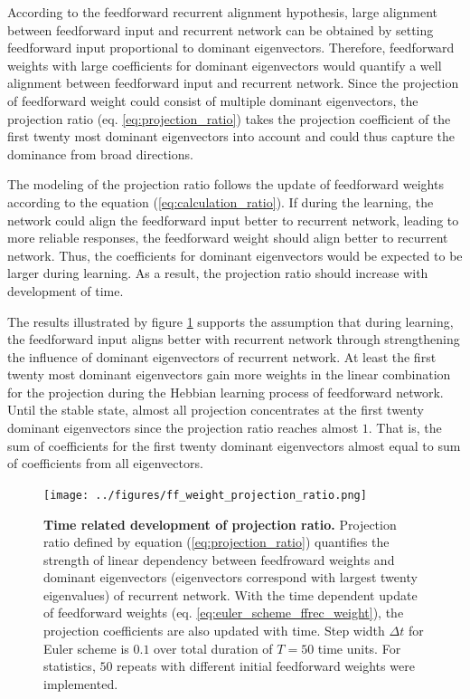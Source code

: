 \documentclass[11pt]{article}
\begin{document}
	According to the feedforward recurrent alignment hypothesis, large alignment between feedforward input and recurrent network can be obtained by setting feedforward input proportional to dominant eigenvectors. 
	Therefore, feedforward weights with large coefficients for dominant eigenvectors would quantify a well alignment between feedforward input and recurrent network. Since the projection of feedforward weight could consist of multiple dominant eigenvectors, the projection ratio (eq. \ref{eq:projection_ratio}) takes the projection coefficient of the first twenty most dominant eigenvectors into account and could thus capture the dominance from broad directions. 
	
	The modeling of the projection ratio follows the update of feedforward weights according to the equation (\ref{eq:calculation_ratio}). If during the learning, the network could align the feedforward input better to recurrent network, leading to more reliable responses, the feedforward weight should align better to recurrent network. Thus, the coefficients for dominant eigenvectors would be expected to be larger during learning. As a result, the projection ratio should increase with development of time. 
	
	The results illustrated by figure \ref{fig:projection_ratio_in_time} supports the assumption that during learning, the feedforward input aligns better with recurrent network through strengthening the influence of dominant eigenvectors of recurrent network. At least the first twenty most dominant eigenvectors gain more weights in the linear combination for the projection during the Hebbian learning process of feedforward network. Until the stable state, almost all projection concentrates at the first twenty dominant eigenvectors since the projection ratio reaches almost $1$. That is, the sum of coefficients for the first twenty dominant eigenvectors almost equal to sum of coefficients from all eigenvectors. 
	
		\begin{figure}
			\centering
			\texttt{[image: ../figures/ff\_weight\_projection\_ratio.png]}
			\caption{\textbf{Time related development of projection ratio.} Projection ratio defined by equation (\ref{eq:projection_ratio}) quantifies the strength of linear dependency between feedfroward weights and dominant eigenvectors (eigenvectors correspond with largest twenty eigenvalues) of recurrent network. With the time dependent update of feedforward weights (eq. \ref{eq:euler_scheme_ffrec_weight}), the projection coefficients are also updated with time. Step width $\Delta t$ for Euler scheme is $0.1$ over total duration of $T=50$ time units. For statistics, $50$ repeats with different initial feedforward weights were implemented.}
			\label{fig:projection_ratio_in_time}
		\end{figure}
	
\end{document}
